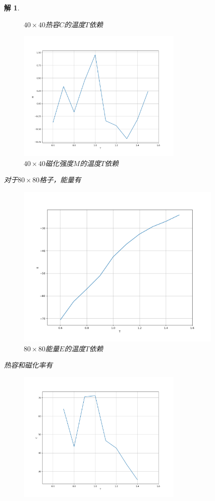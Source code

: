 \documentclass[10pt]{ctexart}
\newtheorem*{solution}{解}
\begin{document}
\begin{solution}
\begin{figure}[H]
\begin{minipage}{0.45\linewidth}
            \caption{$40\times 40$热容$C$的温度$T$依赖}
        \end{minipage}
        \qquad
        \begin{minipage}{0.45\linewidth}
            \centering
            \includegraphics[width=8cm]{M_40.png}
            \caption{$40\times 40$磁化强度$M$的温度$T$依赖}
        \end{minipage}
    \end{figure}
    对于$80\times 80$格子，能量有
    \begin{figure}[H]
        \centering
        \includegraphics[width=10cm]{E_80.png}
        \caption{$80\times 80$能量$E$的温度$T$依赖}
    \end{figure}
    热容和磁化率有
    \begin{figure}[H]
        \centering
        \begin{minipage}{0.45\linewidth}
            \centering
            \includegraphics[width=8cm]{C_80.png}

\end{minipage}
\end{figure}
\end{solution}
\end{document}
